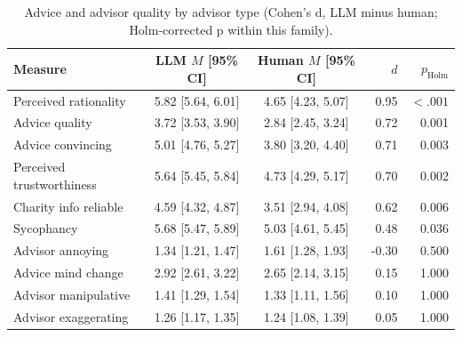 \begin{table}

\caption{\label{tab:advisor_quality}Advice and advisor quality by advisor type (Cohen's d, LLM minus human; Holm-corrected p within this family).}
\centering
\begin{tabular}[t]{lccrr}
\toprule
Measure & LLM $M$ [95\% CI] & Human $M$ [95\% CI] & $d$ & $p_{\mathrm{Holm}}$\\
\midrule
Perceived rationality & 5.82 [5.64, 6.01] & 4.65 [4.23, 5.07] & 0.95 & $<.001$\\
Advice quality & 3.72 [3.53, 3.90] & 2.84 [2.45, 3.24] & 0.72 & 0.001\\
Advice convincing & 5.01 [4.76, 5.27] & 3.80 [3.20, 4.40] & 0.71 & 0.003\\
Perceived trustworthiness & 5.64 [5.45, 5.84] & 4.73 [4.29, 5.17] & 0.70 & 0.002\\
Charity info reliable & 4.59 [4.32, 4.87] & 3.51 [2.94, 4.08] & 0.62 & 0.006\\
\addlinespace
Sycophancy & 5.68 [5.47, 5.89] & 5.03 [4.61, 5.45] & 0.48 & 0.036\\
Advisor annoying & 1.34 [1.21, 1.47] & 1.61 [1.28, 1.93] & -0.30 & 0.500\\
Advice mind change & 2.92 [2.61, 3.22] & 2.65 [2.14, 3.15] & 0.15 & 1.000\\
Advisor manipulative & 1.41 [1.29, 1.54] & 1.33 [1.11, 1.56] & 0.10 & 1.000\\
Advisor exaggerating & 1.26 [1.17, 1.35] & 1.24 [1.08, 1.39] & 0.05 & 1.000\\
\bottomrule
\end{tabular}
\end{table}
